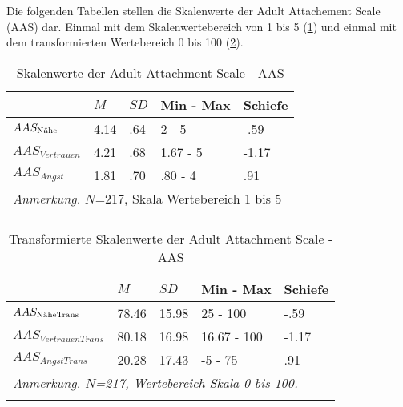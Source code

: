 Die folgenden Tabellen stellen die Skalenwerte der Adult Attachement Scale (AAS) dar. Einmal mit dem Skalenwertebereich von 1 bis 5 (\ref{table:AppAASDeskriptiv}) und einmal mit dem transformierten Wertebereich 0 bis 100 (\ref{table:AppAASDeskriptivTrans}).

\begin{table}[ht]
\begin{tabular}{m{6em} m{3em}  m{3em}  m{5em} m{3em}} 
  \hline
  & $M$ & $SD$ & Min - Max & Schiefe\\
  \hline
  $AAS_{\textnormal{Nähe}}$ & 4.14 & .64 & 2 - 5 & -.59\\
  $AAS_{Vertrauen}$ & 4.21 & .68 & 1.67 - 5 & -1.17\\
  $AAS_{Angst}$ & 1.81 & .70 & .80 - 4 & .91 \\
  \hline
  \multicolumn{5}{l}{\textit{Anmerkung.} $N$=217, Skala Wertebereich 1 bis 5}\\
  &&&&\\
\end{tabular}
\caption{Skalenwerte der Adult Attachment Scale - AAS}
\label{table:AppAASDeskriptiv}
\end{table}

\begin{table}[ht]
\begin{tabular}{m{7em} m{3em}  m{3em}  m{5em} m{3em}} 
  \hline
  & $M$ & $SD$ & Min - Max & Schiefe\\
  \hline
  $AAS_{\textit{\textnormal{NäheTrans}}}$ & 78.46 & 15.98 & 25 - 100 & -.59\\
  $AAS_{VertrauenTrans}$ & 80.18 & 16.98 & 16.67 - 100 & -1.17\\
  $AAS_{AngstTrans}$ & 20.28 & 17.43 & -5 - 75 & .91 \\
  \hline
  \multicolumn{5}{l}{\textit{Anmerkung. $N$=217, Wertebereich Skala 0 bis 100.}}\\
  &&&&\\
\end{tabular}
\caption{Transformierte Skalenwerte der Adult Attachment Scale - AAS}
\label{table:AppAASDeskriptivTrans}
\end{table}